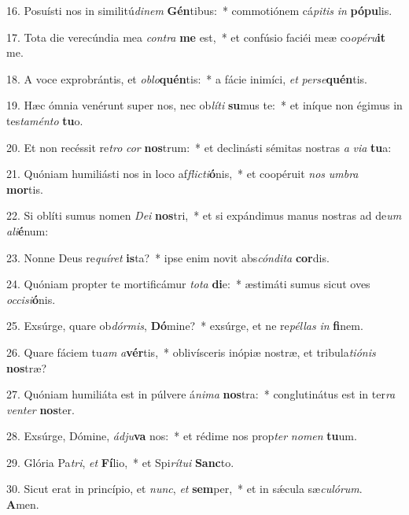 16. Posuísti nos in similitú\textit{di}\textit{nem} \textbf{Gén}tibus:~*  commotiónem cá\textit{pi}\textit{tis} \textit{in} \textbf{pó}\textbf{pu}lis.\

17. Tota die verecúndia mea \textit{con}\textit{tra} \textbf{me} est,~*  et confúsio faciéi meæ co\textit{o}\textit{pé}\textit{ru}\textbf{it} me.\

18. A voce exprobrántis, et \textit{ob}\textit{lo}\textbf{quén}tis:~*  a fácie inimíci, \textit{et} \textit{per}\textit{se}\textbf{quén}tis.\

19. Hæc ómnia venérunt super nos, nec ob\textit{lí}\textit{ti} \textbf{su}mus te:~*  et iníque non égimus in tes\textit{ta}\textit{mén}\textit{to} \textbf{tu}o.\

20. Et non recéssit re\textit{tro} \textit{cor} \textbf{nos}trum:~*  et declinásti sémitas nostras \textit{a} \textit{vi}\textit{a} \textbf{tu}a:\

21. Quóniam humiliásti nos in loco af\textit{flic}\textit{ti}\textbf{ó}nis,~*  et coopéruit \textit{nos} \textit{um}\textit{bra} \textbf{mor}tis.\

22. Si oblíti sumus nomen \textit{De}\textit{i} \textbf{nos}tri,~*  et si expándimus manus nostras ad de\textit{um} \textit{a}\textit{li}\textbf{é}num:\

23. Nonne Deus re\textit{quí}\textit{ret} \textbf{is}ta?~*  ipse enim novit abs\textit{cón}\textit{di}\textit{ta} \textbf{cor}dis.\

24. Quóniam propter te mortificámur \textit{to}\textit{ta} \textbf{di}e:~*  æstimáti sumus sicut oves \textit{oc}\textit{ci}\textit{si}\textbf{ó}nis.\

25. Exsúrge, quare ob\textit{dór}\textit{mis}, \textbf{Dó}mine?~*  exsúrge, et ne re\textit{pél}\textit{las} \textit{in} \textbf{fi}nem.\

26. Quare fáciem tu\textit{am} \textit{a}\textbf{vér}tis,~*  oblivísceris inópiæ nostræ, et tribula\textit{ti}\textit{ó}\textit{nis} \textbf{nos}træ?\

27. Quóniam humiliáta est in púlvere á\textit{ni}\textit{ma} \textbf{nos}tra:~*  conglutinátus est in ter\textit{ra} \textit{ven}\textit{ter} \textbf{nos}ter.\

28. Exsúrge, Dómine, \textit{ád}\textit{ju}\textbf{va} nos:~*  et rédime nos prop\textit{ter} \textit{no}\textit{men} \textbf{tu}um.\

29. Glória Pa\textit{tri}, \textit{et} \textbf{Fí}lio,~*  et Spi\textit{rí}\textit{tu}\textit{i} \textbf{Sanc}to.\

30. Sicut erat in princípio, et \textit{nunc}, \textit{et} \textbf{sem}per,~*  et in sǽcula sæ\textit{cu}\textit{ló}\textit{rum}. \textbf{A}men.\

